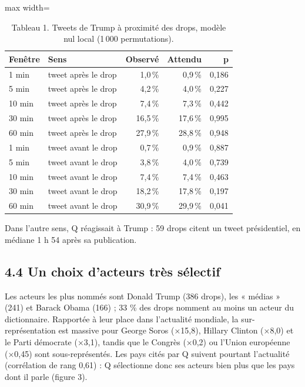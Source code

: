 \documentclass[11pt,a4paper]{article}
\begin{document}
\begin{table}[htbp]
\centering\small
\caption*{Tableau 1. Tweets de Trump à proximité des drops, modèle nul local (1 000 permutations).}
\begin{adjustbox}{max width=\linewidth}
\begin{tabular}{llrrr}
\toprule
\textbf{Fenêtre} & \textbf{Sens} & \textbf{Observé} & \textbf{Attendu} & \textbf{p} \\
\midrule
1 min & tweet après le drop & 1,0 \% & 0,9 \% & 0,186 \\
5 min & tweet après le drop & 4,2 \% & 4,0 \% & 0,227 \\
10 min & tweet après le drop & 7,4 \% & 7,3 \% & 0,442 \\
30 min & tweet après le drop & 16,5 \% & 17,6 \% & 0,995 \\
60 min & tweet après le drop & 27,9 \% & 28,8 \% & 0,948 \\
1 min & tweet avant le drop & 0,7 \% & 0,9 \% & 0,887 \\
5 min & tweet avant le drop & 3,8 \% & 4,0 \% & 0,739 \\
10 min & tweet avant le drop & 7,4 \% & 7,4 \% & 0,463 \\
30 min & tweet avant le drop & 18,2 \% & 17,8 \% & 0,197 \\
60 min & tweet avant le drop & 30,9 \% & 29,9 \% & 0,041 \\
\bottomrule
\end{tabular}
\end{adjustbox}
\end{table}

Dans l'autre sens, Q réagissait à Trump : 59 drops citent un tweet présidentiel, en médiane 1 h 54 après sa publication.

\subsection*{4.4 Un choix d'acteurs très sélectif}

Les acteurs les plus nommés sont Donald Trump (386 drops), les « médias » (241) et Barack Obama (166) ; 33 \% des drops nomment au moins un acteur du dictionnaire. Rapportée à leur place dans l'actualité mondiale, la sur-représentation est massive pour George Soros (×15,8), Hillary Clinton (×8,0) et le Parti démocrate (×3,1), tandis que le Congrès (×0,2) ou l'Union européenne (×0,45) sont sous-représentés. Les pays cités par Q suivent pourtant l'actualité (corrélation de rang 0,61) : Q sélectionne donc ses acteurs bien plus que les pays dont il parle (figure 3).
\end{document}
